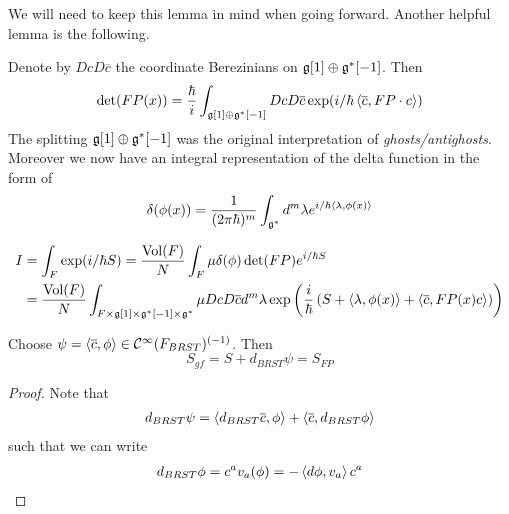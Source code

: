 We will need to keep this lemma in mind when going forward. Another helpful lemma is the following.

\begin{lem}
  Denote by $Dc D\overline{c}$ the coordinate Berezinians on $\mathfrak{g}[1] \oplus \mathfrak{g}^*[-1]$. Then
  \begin{equation}
    \det(FP(x)) = \frac{\hbar}{i} \int_{\mathfrak{g}[1] \oplus \mathfrak{g}^*[-1]} DcD\overline{c} \exp(i/\hbar \left\langle \overline{c} , FP \cdot c \right\rangle)
  \end{equation}
  The splitting $\mathfrak{g}[1] \oplus \mathfrak{g}^*[-1]$ was the original interpretation of \emph{ghosts/antighosts}. Moreover we now have an integral representation of the delta function in the form of
  \begin{equation}
    \delta(\phi(x)) = \frac{1}{(2\pi\hbar)^m} \int_{\gf^*} d^m \lambda e^{i/\hbar \pair{\lambda}{\phi(x)}}
  \end{equation}
\end{lem}

\begin{theo}
\label{theorem:FP}
  \begin{align}
    I &= \int_F \exp(i/\hbar S) = \frac{\vol(F)}{N} \int_F \mu \delta(\phi) \det(FP) e^{i/\hbar S} \\
    &= \frac{\vol(F)}{N} \int_{F \times \gf[1] \times \gf^*[-1] \times \gf^*} \mu DcD\overline{c} d^m \lambda \exp\left( \frac{i}{\hbar} \left( S + \pair{\lambda}{\phi(x)} + \pair{\overline{c}}{FP(x) c} \right)\right)
  \end{align}
\end{theo}

\begin{theo}
\label{theorem:FP_BRST}
  Choose $\psi = \pair{\overline{c}}{\phi} \in \Ci(F_{BRST})^{(-1)}$. Then
  \begin{equation}
    S_{gf} = S + d_{BRST} \psi = S_{FP}
  \end{equation}
\begin{proof}
  Note that
  \begin{align}
    d_{BRST} \psi = \pair{d_{BRST} \overline{c}}{\phi} + \pair{\overline{c}}{d_{BRST} \phi}
  \end{align}
  such that we can write
  \begin{align}
    d_{BRST} \phi = c^a v_a (\phi) = - \pair{d\phi}{v_a} c^a
  \end{align}
\end{proof}
\end{theo}

